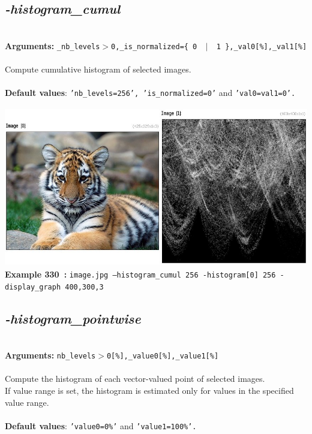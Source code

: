 \documentclass[a4paper,11pt,twoside]{book}
\begin{document}
\subsection{\emph{-histogram\_cumul} }\vspace*{-0.5em}
~\\\textbf{Arguments: } 
{\small \texttt{\_nb\_levels$>$0,\_is\_normalized=\{ 0 ~$|$~ 1 \},\_val0[\%],\_val1[\%]}}\\~\\
Compute cumulative histogram of selected images.
~\\~\\\textbf{Default values}: {\small \texttt{'nb\_levels=256', 'is\_normalized=0'} and \texttt{'val0=val1=0'.}}
\begin{center}\includegraphics[keepaspectratio=true,height=7cm,width=\textwidth]{img/gmic_def330.jpg}\\
{\footnotesize \textbf{Example 330~:} \texttt{image.jpg --histogram\_cumul 256 -histogram[0] 256 -display\_graph 400,300,3}}
\end{center}

\subsection{\emph{-histogram\_pointwise} }\vspace*{-0.5em}
~\\\textbf{Arguments: } 
{\small \texttt{nb\_levels$>$0[\%],\_value0[\%],\_value1[\%]}}\\~\\
Compute the histogram of each vector-valued point of selected images.
~\\If value range is set, the histogram is estimated only for values in the specified
value range.
~\\~\\\textbf{Default values}: {\small \texttt{'value0=0\%'} and \texttt{'value1=100\%'.}}
\end{document}
